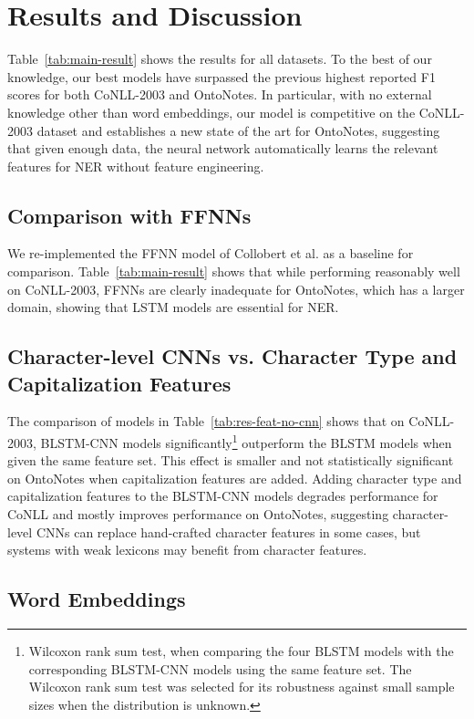 \documentclass[11pt,letterpaper]{article}
\begin{document}
\section{Results and Discussion}

Table~\ref{tab:main-result} shows the results for all datasets. To the best of our knowledge, our best models have surpassed the previous highest reported F1 scores for both CoNLL-2003 and OntoNotes. In particular, with no external knowledge other than word embeddings, our model is competitive on the CoNLL-2003 dataset and establishes a new state of the art for OntoNotes, suggesting that given enough data, the neural network automatically learns the relevant features for NER without feature engineering.

\subsection{Comparison with FFNNs}

We re-implemented the FFNN model of Collobert et al.  as a baseline for comparison. Table~\ref{tab:main-result} shows that while performing reasonably well on CoNLL-2003, FFNNs are clearly inadequate for OntoNotes, which has a larger domain, showing that LSTM models are essential for NER.

\subsection{Character-level CNNs vs. Character Type and Capitalization Features}

The comparison of models in Table~\ref{tab:res-feat-no-cnn} shows that on CoNLL-2003, BLSTM-CNN models significantly\footnote{Wilcoxon rank sum test,  when comparing the four BLSTM models with the corresponding BLSTM-CNN models using the same feature set. The Wilcoxon rank sum test was selected for its robustness against small sample sizes when the distribution is unknown.} outperform the BLSTM models when given the same feature set. This effect is smaller and not statistically significant on OntoNotes when capitalization features are added. 
Adding character type and capitalization features to the BLSTM-CNN models degrades performance for CoNLL and mostly improves performance on OntoNotes, suggesting character-level CNNs can replace hand-crafted character features in some cases, but systems with weak lexicons may benefit from character features.

\subsection{Word Embeddings}
\end{document}
